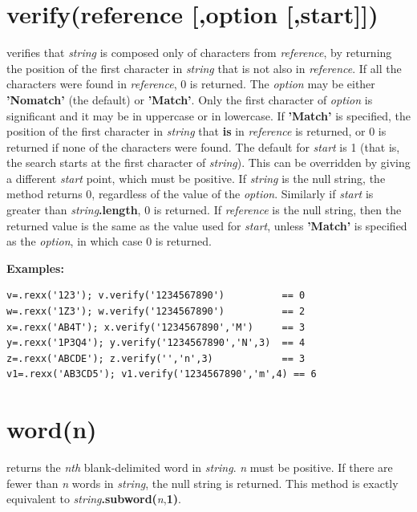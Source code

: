 \section{verify(reference [,option [,start{]]})}\label{refverify}
verifies that \emph{string} is composed only of characters
from \emph{reference}, by returning the position of the first
character in \emph{string} that is not also in
\emph{reference}.  If all the characters were found in
\emph{reference}, 0 is returned.
 The \emph{option} may be either \textbf{'Nomatch'} (the
default) or \textbf{'Match'}.  Only the first character of
\emph{option} is significant and it may be in uppercase or in
lowercase.
If \textbf{'Match'} is specified, the position of the first character
in \emph{string} that \textbf{is} in \emph{reference} is
returned, or 0 is returned if none of the characters were found.
 The default for \emph{start} is 1 (that is, the search starts at
the first character of \emph{string}).
This can be overridden by giving a different \emph{start} point,
which must be positive.
 If \emph{string} is the null string, the method returns 0,
regardless of the value of the \emph{option}.
Similarly if \emph{start} is greater than
\emph{string}\textbf{.length}, 0 is returned.
 If \emph{reference} is the null string, then the returned value
is the same as the value used for \emph{start},
unless \textbf{'Match'} is specified as the \emph{option}, in
which case 0 is returned.
 
\textbf{Examples:}
\begin{lstlisting}
v=.rexx('123'); v.verify('1234567890')          == 0
w=.rexx('1Z3'); w.verify('1234567890')          == 2
x=.rexx('AB4T'); x.verify('1234567890','M')     == 3
y=.rexx('1P3Q4'); y.verify('1234567890','N',3)  == 4
z=.rexx('ABCDE'); z.verify('','n',3)            == 3
v1=.rexx('AB3CD5'); v1.verify('1234567890','m',4) == 6
\end{lstlisting}

\section{word(n)}\label{refword}
returns the \emph{n}\emph{th} blank-delimited word in
\emph{string}.
\emph{n} must be positive.
If there are fewer than \emph{n} words in \emph{string}, the
null string is returned.
This method is exactly equivalent to
\emph{string}\textbf{.subword(}\emph{n},\textbf{1)}.
 
